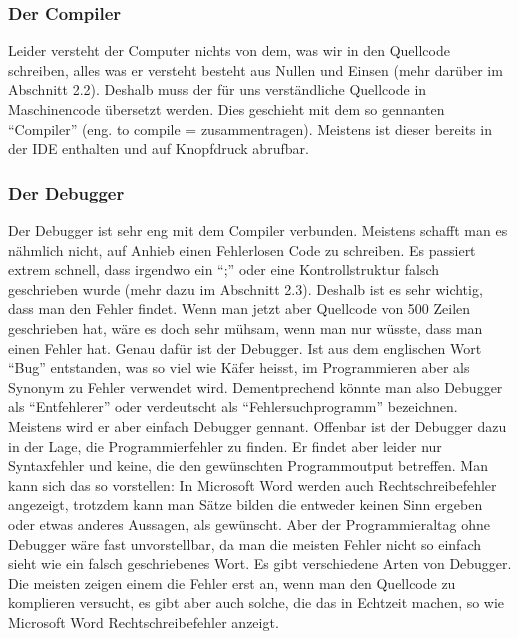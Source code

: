 \subsubsection{Der Compiler}
Leider versteht der Computer nichts von dem, was wir in den Quellcode schreiben, alles was er versteht besteht aus Nullen und Einsen (mehr darüber im Abschnitt 2.2). Deshalb muss der für uns verständliche Quellcode in Maschinencode übersetzt werden. Dies geschieht mit dem so gennanten "`Compiler"' (eng. to compile = zusammentragen). Meistens ist dieser bereits in der IDE enthalten und auf Knopfdruck abrufbar. 

\subsubsection{Der Debugger}
Der Debugger ist sehr eng mit dem Compiler verbunden. Meistens schafft man es nähmlich nicht, auf Anhieb einen Fehlerlosen Code zu schreiben. Es passiert extrem schnell, dass irgendwo ein "`;"' oder eine Kontrollstruktur falsch geschrieben wurde (mehr dazu im Abschnitt 2.3). Deshalb ist es sehr wichtig, dass man den Fehler findet. Wenn man jetzt aber Quellcode von 500 Zeilen geschrieben hat, wäre es doch sehr mühsam, wenn man nur wüsste, dass man einen Fehler hat. Genau dafür ist der Debugger. Ist aus dem englischen Wort "`Bug"' entstanden, was so viel wie Käfer heisst, im Programmieren aber als Synonym zu Fehler verwendet wird. Dementprechend könnte man also Debugger als "`Entfehlerer"' oder verdeutscht als "`Fehlersuchprogramm"' bezeichnen. Meistens wird er aber einfach Debugger gennant. Offenbar ist der Debugger dazu in der Lage, die Programmierfehler zu finden. Er findet aber leider nur Syntaxfehler und keine, die den gewünschten Programmoutput betreffen. Man kann sich das so vorstellen: In Microsoft Word werden auch Rechtschreibefehler angezeigt, trotzdem kann man Sätze bilden die entweder keinen Sinn ergeben oder etwas anderes Aussagen, als gewünscht. Aber der Programmieraltag ohne Debugger wäre fast unvorstellbar, da man die meisten Fehler nicht so einfach sieht wie ein falsch geschriebenes Wort. Es gibt verschiedene Arten von Debugger. Die meisten zeigen einem die Fehler erst an, wenn man den Quellcode zu komplieren versucht, es gibt aber auch solche, die das in Echtzeit machen, so wie Microsoft Word Rechtschreibefehler anzeigt. 

